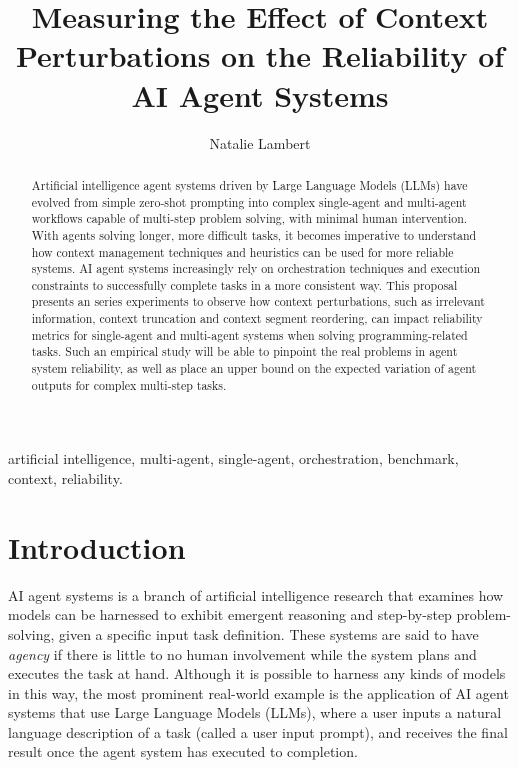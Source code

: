 \documentclass[conference]{IEEEtran}
\begin{document}
\title{Measuring the Effect of Context Perturbations on the Reliability of AI Agent Systems}

\author{Natalie Lambert}

\maketitle

\begin{abstract}
Artificial intelligence agent systems driven by Large Language Models (LLMs) 
have evolved from simple zero-shot prompting into complex single-agent and multi-agent workflows
capable of multi-step problem solving, with minimal human intervention.
With agents solving longer, more difficult tasks, it becomes imperative to understand how context
management techniques and heuristics can be used for more reliable systems.
AI agent systems increasingly rely on orchestration techniques and execution constraints
to successfully complete tasks in a more consistent way.
This proposal presents an series experiments to 
observe how context perturbations, such as irrelevant information, context truncation
and context segment reordering, can impact reliability metrics for
single-agent and multi-agent systems when solving programming-related tasks.
Such an empirical study will be able to pinpoint the real problems in agent system reliability, as
well as place an upper bound on the expected variation of agent outputs for complex multi-step tasks.
\end{abstract}

\begin{IEEEkeywords}
artificial intelligence, multi-agent, single-agent, orchestration, benchmark, context, reliability.
\end{IEEEkeywords}

\section{Introduction}\label{intro}
AI agent systems is a branch of artificial intelligence research that examines how
models can be harnessed to exhibit emergent reasoning and step-by-step problem-solving, given a
specific input task definition.
These systems are said to have \emph{agency} if there is little to no human involvement while the
system plans and executes the task at hand.
Although it is possible to harness any kinds of models in this way, the most prominent real-world
example is the application of AI agent systems that use Large Language Models (LLMs),
where a user inputs a natural language description of a task (called a user input prompt), and receives the
final result once the agent system has executed to completion.
\end{document}
